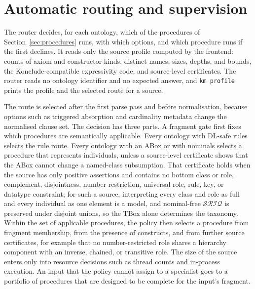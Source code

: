 \section{Automatic routing and supervision}
\label{sec:routing}

The router decides, for each ontology, which of the procedures of
Section~\ref{sec:procedures} runs, with which options, and which procedure
runs if the first declines.  It reads only the source profile computed by the
frontend: counts of axiom and constructor kinds, distinct names, sizes,
depths, and bounds, the Konclude-compatible expressivity code, and
source-level certificates.  The router reads no ontology identifier and no
expected answer, and \texttt{km profile} prints the profile and the selected
route for a source.

The route is selected after the first parse pass and before normalisation,
because options such as triggered absorption and cardinality metadata change
the normalised clause set.  The decision has three parts.  A fragment gate
first fixes which procedures are semantically applicable.  Every ontology with
DL-safe rules selects the rule route.  Every ontology with an ABox or with
nominals selects a procedure that represents individuals, unless a
source-level certificate shows that the ABox cannot change a named-class
subsumption.  That certificate holds when the source has only positive
assertions and contains no bottom class or role, complement, disjointness,
number restriction, universal role, rule, key, or datatype constraint; for
such a source, interpreting every class and role as full and every individual
as one element is a model, and nominal-free $\mathcal{SRIQ}$ is preserved
under disjoint unions, so the TBox alone determines the taxonomy.  Within the
set of applicable procedures, the policy then selects a procedure from
fragment membership, from the presence of constructs, and from further
source certificates, for example that no number-restricted role shares a
hierarchy component with an inverse, chained, or transitive role.  The size of
the source enters only into resource decisions such as thread counts and
in-process execution.  An input that the policy cannot assign to a specialist
goes to a portfolio of procedures that are designed to be complete for the
input's fragment.  

